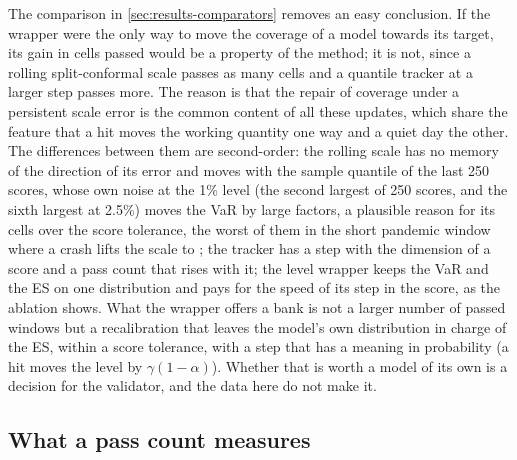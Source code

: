 The comparison in \cref{sec:results-comparators} removes an easy conclusion. If the wrapper were the only way to move the coverage of a model towards its target, its gain in cells passed would be a property of the method; it is not, since a rolling split-conformal scale passes as many cells and a quantile tracker at a larger step passes more. The reason is that the repair of coverage under a persistent scale error is the common content of all these updates, which share the feature that a hit moves the working quantity one way and a quiet day the other. The differences between them are second-order: the rolling scale has no memory of the direction of its error and moves with the sample quantile of the last 250 scores, whose own noise at the 1\% level (the second largest of 250 scores, and the sixth largest at 2.5\%) moves the VaR by large factors, a plausible reason for its \cmpRollTenFzOver{} cells over the score tolerance, the worst of them in the short pandemic window where a crash lifts the scale to \cmpRollWorstScaleMax{}; the tracker has a step with the dimension of a score and a pass count that rises with it; the level wrapper keeps the VaR and the ES on one distribution and pays for the speed of its step in the score, as the ablation shows. What the wrapper offers a bank is not a larger number of passed windows but a recalibration that leaves the model's own distribution in charge of the ES, within a score tolerance, with a step that has a meaning in probability (a hit moves the level by $\gamma(1-\alpha)$). Whether that is worth a model of its own is a decision for the validator, and the data here do not make it.

\subsection{What a pass count measures}
\label{sec:discussion-passcount}

